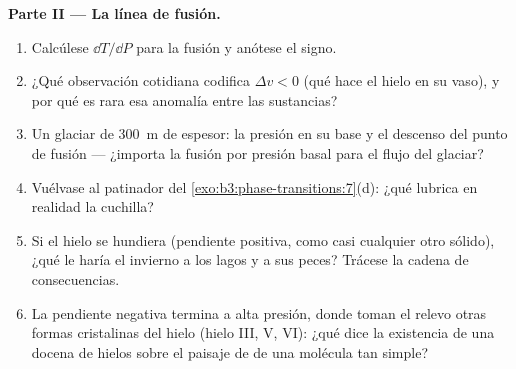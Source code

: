 \begin{problem}
\medskip\noindent\textbf{Parte II --- La línea de fusión.}
\begin{enumerate}[resume]
  \item Calcúlese $\dd T/\dd P$ para la fusión y anótese el signo.
  \item ¿Qué observación cotidiana codifica $\Delta v < 0$ (qué
        hace el hielo en su vaso), y por qué es rara esa anomalía
        entre las sustancias?
  \item Un glaciar de \qty{300}{m} de espesor: la presión en su base
        y el descenso del punto de fusión --- ¿importa la fusión por
        presión basal para el flujo del glaciar?
  \item Vuélvase al patinador del
        \cref{exo:b3:phase-transitions:7}(d): ¿qué lubrica en realidad
        la cuchilla?
  \item Si el hielo se hundiera (pendiente positiva, como casi cualquier otro
        sólido), ¿qué le haría el invierno a los lagos y a sus peces?
        Trácese la cadena de consecuencias.
  \item La pendiente negativa termina a alta presión, donde toman el relevo otras
        formas cristalinas del hielo (hielo III, V, VI): ¿qué dice la
        existencia de una docena de hielos sobre el paisaje de  de una molécula tan simple?
\end{enumerate}


\end{problem}
